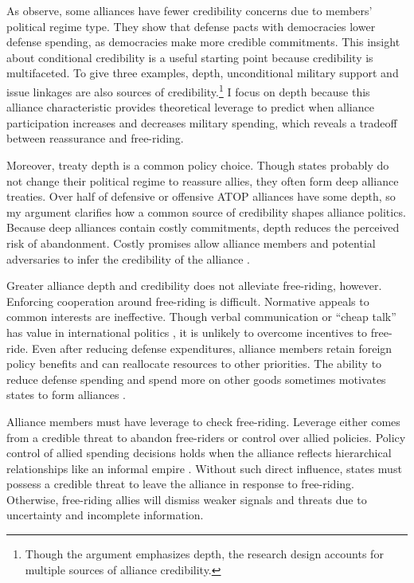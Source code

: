 \documentclass[12pt]{article}
\begin{document}
As \citet{DigiuseppePoast2016} observe, some alliances have fewer credibility concerns due to members' political regime type.
They show that defense pacts with democracies lower defense spending, as democracies make more credible commitments.
This insight about conditional credibility is a useful starting point because credibility is multifaceted. 
To give three examples, depth, unconditional military support \citep{Benson2012, Chibaetal2015} and issue linkages \citep{LongLeeds2006, Poast2012, Poast2013} are also sources of credibility.\footnote{Though the argument emphasizes depth, the research design accounts for multiple sources of alliance credibility.} 
I focus on depth because this alliance characteristic provides theoretical leverage to predict when alliance participation increases and decreases military spending, which reveals a tradeoff between reassurance and free-riding.  


Moreover, treaty depth is a common policy choice. 
Though states probably do not change their political regime to reassure allies, they often form deep alliance treaties. 
Over half of defensive or offensive ATOP alliances have some depth, so my argument clarifies how a common source of credibility shapes alliance politics. 
Because deep alliances contain costly commitments, depth reduces the perceived risk of abandonment.  
Costly promises allow alliance members and potential adversaries to infer the credibility of the alliance \citep{Leeds2003, FuhrmannSechser2014}. 


Greater alliance depth and credibility does not alleviate free-riding, however. 
Enforcing cooperation around free-riding is difficult.
Normative appeals to common interests are ineffective. 
Though verbal communication or ``cheap talk'' has value in international politics \citep{Trager2010}, it is unlikely to overcome incentives to free-ride. 
Even after reducing defense expenditures, alliance members retain foreign policy benefits and can reallocate resources to other priorities. 
The ability to reduce defense spending and spend more on other goods sometimes motivates states to form alliances \citep{Kimball2010, AllenDigiuseppe2013}. 


Alliance members must have leverage to check free-riding. 
Leverage either comes from a credible threat to abandon free-riders or control over allied policies. 
Policy control of allied spending decisions holds when the alliance reflects hierarchical relationships like an informal empire \citep{Lake1996}. 
Without such direct influence, states must possess a credible threat to leave the alliance in response to free-riding. 
Otherwise, free-riding allies will dismiss weaker signals and threats due to uncertainty and incomplete information. 
\end{document}
